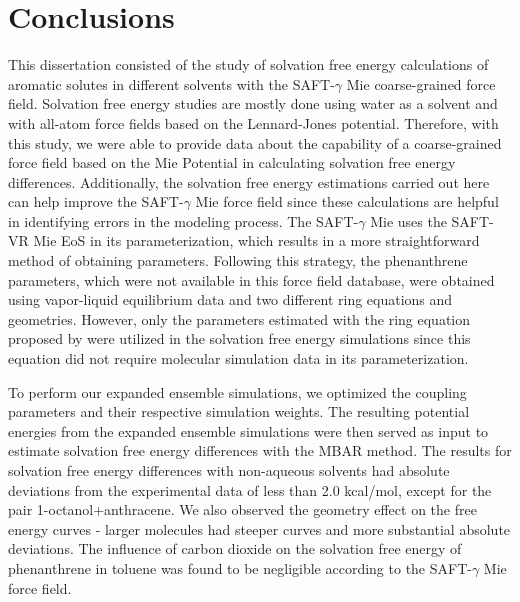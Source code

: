\chapter{Conclusions} %

\label{Chapter6} 

This dissertation consisted of the study of solvation free energy calculations of aromatic solutes in different solvents with the SAFT-$\gamma$ Mie coarse-grained force field. Solvation free energy studies are mostly done using water as a solvent and with all-atom force fields based on the Lennard-Jones potential. Therefore, with this study, we were able to provide data about the capability of a coarse-grained force field based on the Mie Potential in calculating solvation free energy differences. Additionally, the solvation free energy estimations carried out here can help improve the SAFT-$\gamma$  Mie force field since these calculations are helpful in identifying errors in the modeling process. The SAFT-$\gamma$ Mie uses the SAFT-VR Mie EoS in its parameterization, which results in a more straightforward method of obtaining parameters. Following this strategy, the phenanthrene parameters, which were not available in this force field database, were obtained using vapor-liquid equilibrium data and two different ring equations and geometries. However, only the parameters estimated with the ring equation proposed by  were utilized in the solvation free energy simulations since this equation did not require molecular simulation data in its parameterization.

To perform our expanded ensemble simulations, we optimized the coupling parameters and their respective simulation weights. The resulting potential energies from the expanded ensemble simulations were then served as input to estimate solvation free energy differences with the MBAR method. The results for solvation free energy differences with non-aqueous solvents had absolute deviations from the experimental
data of less than 2.0 kcal/mol, except for the pair 1-octanol+anthracene. We also observed the geometry effect on the free energy curves - larger molecules had steeper curves and more substantial absolute deviations. The influence of carbon dioxide on the solvation free energy of phenanthrene in toluene was found to be negligible according to the SAFT-$\gamma$ Mie force field. 

